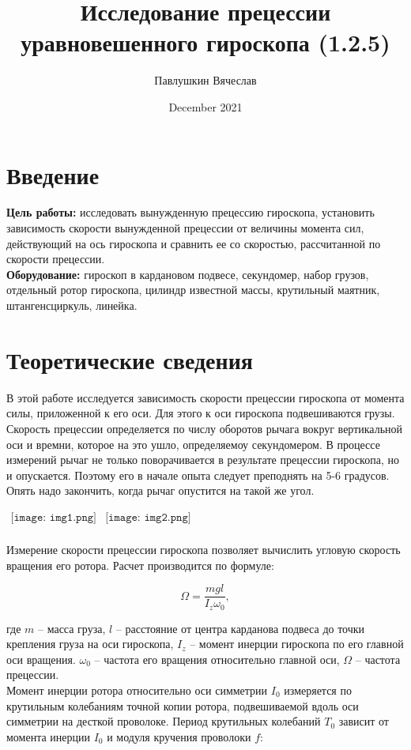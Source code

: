\documentclass[a4paper,12pt]{article}
\title{\textbf{Исследование прецессии уравновешенного гироскопа (1.2.5)}}
\author{Павлушкин Вячеслав}
\date{December 2021}
\begin{document}
	\maketitle

	\section{Введение}

	\textbf{Цель работы:} исследовать вынужденную прецессию гироскопа, установить зависимость скорости вынужденной прецессии от величины момента сил, действующий на ось гироскопа и сравнить ее со скоростью, рассчитанной по скорости прецессии.\\
	\textbf{Оборудование:} гироскоп в кардановом подвесе, секундомер, набор грузов, отдельный ротор гироскопа, цилиндр известной массы, крутильный маятник, штангенсциркуль, линейка.

	\section{Теоретические сведения}

	В этой работе исследуется зависимость скорости прецессии гироскопа от момента силы, приложенной к его оси. Для этого к оси гироскопа подвешиваются грузы. Скорость прецессии определяется по числу оборотов рычага вокруг вертикальной оси и времни, которое на это ушло, определяемоу секундомером. В процессе измерений рычаг не только поворачивается в результате прецессии гироскопа, но и опускается. Поэтому его в начале опыта следует преподнять на 5-6 градусов.  Опять надо закончить, когда рычаг опустится на такой же угол.\\
	\begin{center}$
		\begin{array}{cc}
			\texttt{[image: img1.png]}&
			\texttt{[image: img2.png]}\\
		\end{array}$
	\end{center}

	Измерение скорости прецессии гироскопа позволяет вычислить угловую скорость вращения его ротора. Расчет производится по формуле:

	\begin{equation}
		\Omega = \frac{mgl}{I_z\omega_0},
	\end{equation}

	где $m$ -- масса груза, $l$ -- расстояние от центра карданова подвеса до точки крепления груза на оси гироскопа, $I_z$ -- момент инерции гироскопа по его главной оси вращения. $\omega_0$ -- частота его вращения относительно главной оси, $\Omega$ -- частота прецессии.\\
	Момент инерции ротора относительно оси симметрии $I_0$ измеряется по крутильным колебаниям точной копии ротора, подвешиваемой вдоль оси симметрии на десткой проволоке. Период крутильных колебаний $T_0$ зависит от момента инерции $I_0$ и модуля кручения проволоки $f$:
\end{document}
